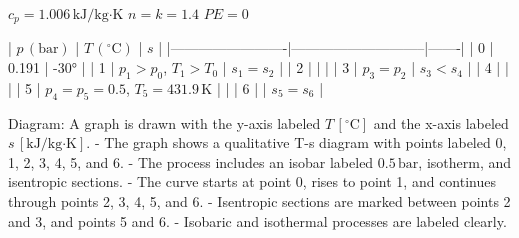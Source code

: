 \( c_p = 1.006 \, \text{kJ/kg·K} \)  
\( n = k = 1.4 \)  
\( PE = 0 \)  

| \( p \, (\text{bar}) \) | \( T \, (^\circ \text{C}) \) | \( s \) |  
|-------------------------|-----------------------------|-------|  
| 0 | 0.191 | -30° |  
| 1 | \( p_1 > p_0 \), \( T_1 > T_0 \) | \( s_1 = s_2 \) |  
| 2 | | |  
| 3 | \( p_3 = p_2 \) | \( s_3 < s_4 \) |  
| 4 | | |  
| 5 | \( p_4 = p_5 = 0.5 \), \( T_5 = 431.9 \, \text{K} \) | |  
| 6 | | \( s_5 = s_6 \) |  

Diagram:  
A graph is drawn with the y-axis labeled \( T \, [^\circ \text{C}] \) and the x-axis labeled \( s \, [\text{kJ/kg·K}] \).  
- The graph shows a qualitative T-s diagram with points labeled 0, 1, 2, 3, 4, 5, and 6.  
- The process includes an isobar labeled \( 0.5 \, \text{bar} \), isotherm, and isentropic sections.  
- The curve starts at point 0, rises to point 1, and continues through points 2, 3, 4, 5, and 6.  
- Isentropic sections are marked between points 2 and 3, and points 5 and 6.  
- Isobaric and isothermal processes are labeled clearly.